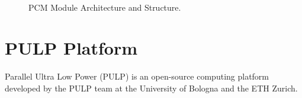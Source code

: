 \begin{figure}[!tbh]
\begin{minipage}{.5\textwidth}
\end{minipage}
\hfill    
\begin{minipage}{.5\textwidth}
\end{minipage}
    \caption{\\ PCM Module Architecture and Structure. }
    \label{fig:PCM-module-and-structure}
\end{figure}


\section{PULP Platform}\label{sec:pulp}
Parallel Ultra Low Power (PULP) is an open-source computing platform developed by the PULP team at the University of Bologna and the ETH Zurich.

